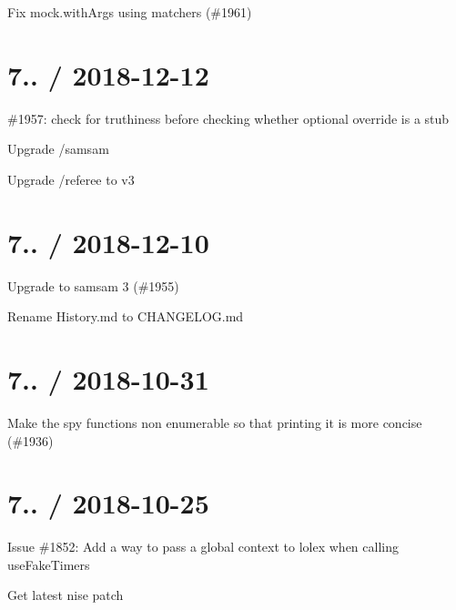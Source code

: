 
\begin{DoxyItemize}
\item Fix mock.\+with\+Args using matchers (\#1961)
\end{DoxyItemize}

\section*{7.. / 2018-\/12-\/12 }


\begin{DoxyItemize}
\item \#1957\+: check for truthiness before checking whether optional override is a stub
\item Upgrade /samsam
\item Upgrade /referee to v3
\end{DoxyItemize}

\section*{7.. / 2018-\/12-\/10 }


\begin{DoxyItemize}
\item Upgrade to samsam 3 (\#1955)
\item Rename History.\+md to C\+H\+A\+N\+G\+E\+L\+O\+G.\+md
\end{DoxyItemize}

\section*{7.. / 2018-\/10-\/31 }


\begin{DoxyItemize}
\item Make the spy functions non enumerable so that printing it is more concise (\#1936)
\end{DoxyItemize}

\section*{7.. / 2018-\/10-\/25 }


\begin{DoxyItemize}
\item Issue \#1852\+: Add a way to pass a global context to lolex when calling use\+Fake\+Timers
\item Get latest \textquotesingle{}nise\textquotesingle{} patch
\end{DoxyItemize}

